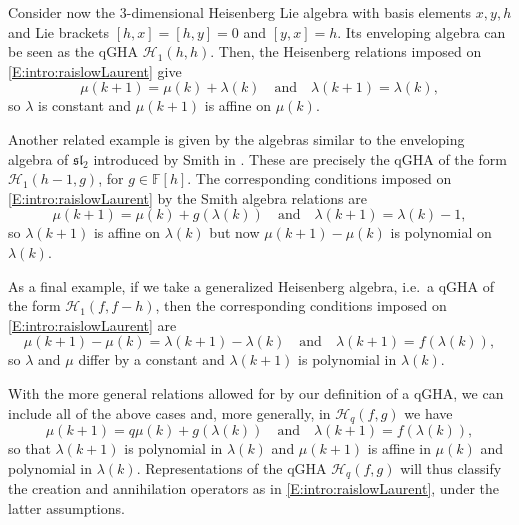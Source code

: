 \documentclass{commat}
\newcommand{\FF}{\mathbb{F}}
\newcommand{\hqfg}[1][f,g]{\mathcal{H}_q(#1)}
\newcommand{\hh}{\mathcal{H}}
\begin{document}
Consider now the $3$-dimensional Heisenberg Lie algebra with basis elements $x, y, h$ and Lie brackets $[h,x]=[h,y]=0$ and $[y,x]=h$.
Its enveloping algebra can be seen as the qGHA $\hh_1(h, h)$. Then, the Heisenberg relations imposed on \eqref{E:intro:raislowLaurent} give
\begin{equation*}
	\mu(k+1)=\mu(k)+\lambda(k) \quad  \mbox{and}\quad \lambda(k+1)=\lambda(k),
\end{equation*}
so $\lambda$ is constant and $\mu(k+1)$ is affine on $\mu(k)$.

Another related example is given by the algebras similar to the enveloping algebra of $\mathfrak{sl}_2$ introduced by Smith in \cite{spS90}. These are precisely the qGHA of the form $\hh_1(h-1,g)$, for $g\in\FF[h]$. The corresponding conditions imposed on \eqref{E:intro:raislowLaurent} by the Smith algebra relations are
\begin{equation*}
	\mu(k+1)=\mu(k)+g(\lambda(k)) \quad  \mbox{and}\quad \lambda(k+1)=\lambda(k)-1,
\end{equation*}
so  $\lambda(k+1)$ is affine on $\lambda(k)$ but now $\mu(k+1)-\mu(k)$ is polynomial on $\lambda(k)$.

As a final example, if we take a generalized Heisenberg algebra, i.e.\ a qGHA of the form $\hh_1(f,f-h)$, then the corresponding conditions imposed on \eqref{E:intro:raislowLaurent} are
\begin{equation*}
	\mu(k+1)-\mu(k)=\lambda(k+1)-\lambda(k) \quad  \mbox{and}\quad \lambda(k+1)=f(\lambda(k)),
\end{equation*}
so $\lambda$ and $\mu$ differ by a constant and $\lambda(k+1)$ is polynomial in $\lambda(k)$.

With the more general relations allowed for by our definition of a qGHA, we can include all of the above cases and, more generally, in $\hqfg$ we have
\begin{equation*}
	\mu(k+1)=q\mu(k)+g(\lambda(k)) \quad  \mbox{and}\quad \lambda(k+1)=f(\lambda(k)),
\end{equation*}
so that $\lambda(k+1)$ is polynomial in $\lambda(k)$ and $\mu(k+1)$ is affine in $\mu(k)$ and polynomial in $\lambda(k)$. Representations of the qGHA $\hqfg$ will thus classify the creation and annihilation operators as in \eqref{E:intro:raislowLaurent}, under the latter assumptions.
\end{document}
